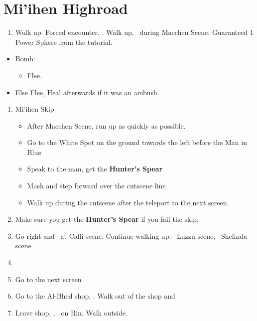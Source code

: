 \chapter{Mi'ihen Highroad}

\begin{enumerate}
	\item Walk up. Forced encounter, \sd. Walk up, \sd\ during Maechen Scene. Guaranteed 1 Power Sphere from the tutorial.
\end{enumerate}
\begin{encounters}
	\begin{itemize}
		\item Bomb:
		      \begin{itemize}
			      \kimahrif Lancet Bomb, learn \textbf{Self Destruct}
			      \item Flee.
		      \end{itemize}
		\item Else Flee,  Heal afterwards if it was an ambush.
	\end{itemize}
\end{encounters}
\bothcb\wincb\losscb
\begin{enumerate}[resume]
	\item {Mi'ihen Skip}
	      \begin{itemize}
		      \item After Maechen Scene, run up as quickly as possible.
		      \item Go to the White Spot on the ground towards the left before the Man in Blue
		      \item Speak to the man, get the \textbf{Hunter's Spear}
		      \item Mash and step forward over the cutscene line
		      \item Walk up during the cutscene after the teleport to the next screen.
	      \end{itemize}
	\item Make sure you get the \textbf{Hunter's Spear} if you fail the skip.
	\item Go right and \sd\ at Calli scene. Continue walking up. \sd\ Luzzu scene, \sd\ Shelinda scene
	\item \formation{\tidus}{\wakka}{\kimahri}
	\item Go to the next screen
	\item Go to the Al-Bhed shop, \sd. Walk out of the shop and \cs[5:30]
	\item Leave shop, \sd. \sd\ on Rin. Walk outside.
\end{enumerate}
